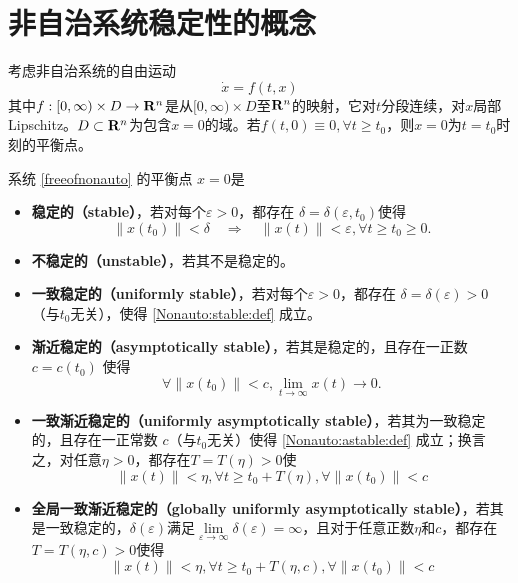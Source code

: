 \section{非自治系统稳定性的概念}\label{3Bref}
考虑非自治系统的自由运动
\begin{equation}\label{freeofnonauto}
  \dot{x}=f(t,x)
\end{equation}
其中$f : [0, \infty) \times D \rightarrow \mathbf{R}{}^n$是从$[0, \infty) \times D$至$\mathbf{R}{}^n$的映射，它对$t$分段连续，对$x$局部Lipschitz。$D\subset\mathbf{R}{}^n$为包含$x=0$的域。若$f(t,0)\equiv0,\forall t\ge t_0$，则$x=0$为$t=t_0$时刻的平衡点。
\begin{definition}[非自治系统的稳定性]
 系统 \eqref{freeofnonauto} 的平衡点 $x = 0$是
  \begin{itemize}[leftmargin=1em]
    \item {\bf 稳定的（stable）}，若对每个$\varepsilon > 0$，都存在 $\delta =
    \delta (\varepsilon, t_0)$使得
    \begin{equation}
      \| x (t_0) \| < \delta \quad \Rightarrow \quad \| x (t) \| <
      \varepsilon, \forall t \geq t_0 \geq 0 \label{Nonauto:stable:def} .
    \end{equation}
    \item {\bf 不稳定的（unstable）}，若其不是稳定的。
    
    \item {\bf 一致稳定的（uniformly stable）}，若对每个$\varepsilon > 0$，都存在
    $\delta = \delta (\varepsilon) > 0$（与$t_0$无关），使得 \eqref{Nonauto:stable:def} 成立。
    
    \item {\bf 渐近稳定的（asymptotically stable）}，若其是稳定的，且存在一正数
     $c = c (t_0)$ 使得
    \begin{equation}
      \forall \| x (t_0) \| < c, \lim_{t \rightarrow \infty} x (t) \rightarrow
      0 \label{Nonauto:astable:def} .
    \end{equation}
    \item {\bf 一致渐近稳定的（uniformly asymptotically stable）}，若其为一致稳定的，且存在一正常数 $c$（与$t_0$无关）使得 \eqref{Nonauto:astable:def} 成立；换言之，对任意$\eta>0$，都存在$T=T(\eta)>0$使
    \[\|x(t)\|<\eta,\forall t\ge t_0+T(\eta),\forall\|x(t_0)\|<c\]
    
    \item {\bf 全局一致渐近稳定的（globally uniformly asymptotically stable）}，若其是一致稳定的，$\delta(\varepsilon)$满足$\lim\limits_{\varepsilon\to\infty}\delta(\varepsilon)=\infty$，且对于任意正数$\eta$和$c$，都存在$T=T(\eta,c)>0$使得
    \[\|x(t)\|<\eta,\forall t\ge t_0+T(\eta,c),\forall\|x(t_0)\|<c\]
  \end{itemize}
\end{definition}

